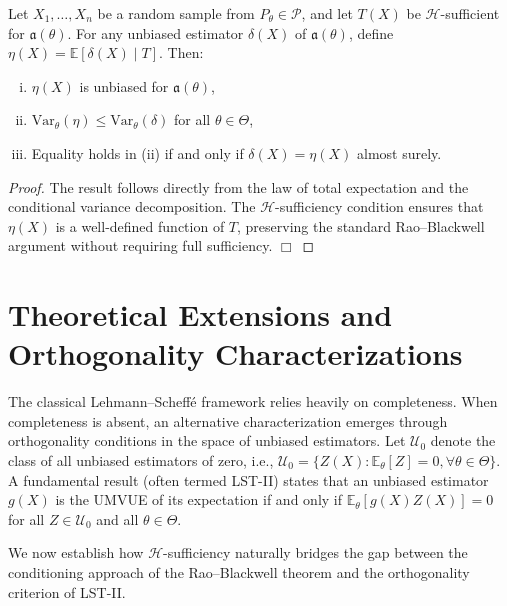 \documentclass[twoside]{article}
\begin{document}
\begin{thm}\label{thm:genRB}
Let $X_1, \dots, X_n$ be a random sample from $P_{\theta} \in \mathcal{P}$, and let $T(X)$ be $\mathscr{H}$-sufficient for $\mathfrak{a}(\theta)$. For any unbiased estimator $\delta(X)$ of $\mathfrak{a}(\theta)$, define $\eta(X) = \mathbb{E}[\delta(X) \mid T]$. Then:
\begin{enumerate}[(i)]
    \item $\eta(X)$ is unbiased for $\mathfrak{a}(\theta)$,
    \item $\mathrm{Var}_{\theta}(\eta) \leq \mathrm{Var}_{\theta}(\delta)$ for all $\theta \in \Theta$,
    \item Equality holds in (ii) if and only if $\delta(X) = \eta(X)$ almost surely.
\end{enumerate}
\end{thm}
\begin{proof}
The result follows directly from the law of total expectation and the conditional variance decomposition. The $\mathscr{H}$-sufficiency condition ensures that $\eta(X)$ is a well-defined function of $T$, preserving the standard Rao--Blackwell argument without requiring full sufficiency. \hfill $\Box$
\end{proof}


\section{Theoretical Extensions and Orthogonality Characterizations}\label{sec:extensions}
The classical Lehmann--Scheff\'{e} framework relies heavily on completeness. When completeness is absent, an alternative characterization emerges through orthogonality conditions in the space of unbiased estimators. Let $\mathcal{U}_0$ denote the class of all unbiased estimators of zero, i.e., $\mathcal{U}_0 = \{ Z(X) : \mathbb{E}_{\theta}[Z] = 0, \forall \theta \in \Theta \}$. A fundamental result (often termed LST-II) states that an unbiased estimator $g(X)$ is the UMVUE of its expectation if and only if $\mathbb{E}_{\theta}[g(X)Z(X)] = 0$ for all $Z \in \mathcal{U}_0$ and all $\theta \in \Theta$.

We now establish how $\mathscr{H}$-sufficiency naturally bridges the gap between the conditioning approach of the Rao--Blackwell theorem and the orthogonality criterion of LST-II.
\end{document}

